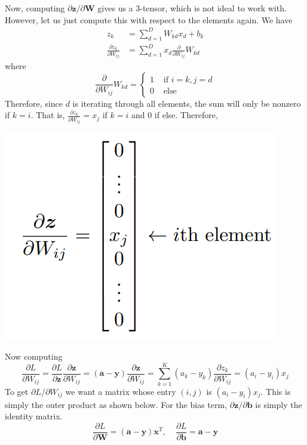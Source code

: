 \documentclass{article}
\theoremstyle{definition}
\begin{document}
  Now, computing $\partial \mathbf{z} / \partial \mathbf{W}$ gives us a $3$-tensor, which is not ideal to work with. However, let us just compute this with respect to the elements again. We have 
  \begin{align*}
      z_k & = \sum_{d=1}^D W_{kd} x_d + b_k \\ 
      \frac{\partial z_k}{\partial W_{ij}} & = \sum_{d=1}^D x_d \frac{\partial}{\partial W_{ij}} W_{kd}
  \end{align*}
  where 
  \[\frac{\partial}{\partial W_{ij}} W_{kd} = \begin{cases} 1 & \text{ if } i = k, j = d \\ 0 & \text{ else} \end{cases}\]
  Therefore, since $d$ is iterating through all elements, the sum will only be nonzero if $k = i$. That is, $\frac{\partial z_k}{\partial W_{ij}} = x_j$ if $k = i$ and $0$ if else. Therefore, 
  \begin{center}
      \includegraphics[scale=0.3]{softmax_deriv.png}
  \end{center}
  Now computing 
  \[\frac{\partial L}{\partial W_{ij}} = \frac{\partial L}{\partial \mathbf{z}} \frac{\partial \mathbf{z}}{\partial W_{ij}} = (\mathbf{a} - \mathbf{y}) \frac{\partial \mathbf{z}}{\partial W_{ij}} = \sum_{k=1}^K (a_k - y_k) \frac{\partial z_k}{\partial W_{ij}} = (a_i - y_i) x_j\]
  To get $\partial L / \partial W_{ij}$ we want a matrix whose entry $(i, j)$ is $(a_i - y_i) x_j$. This is simply the outer product as shown below. For the bias term, $\partial \mathbf{z} / \partial \mathbf{b}$ is simply the identity matrix. 
  \[\frac{\partial L}{\partial \mathbf{W}} = (\mathbf{a} - \mathbf{y}) \mathbf{x}^T, \;\;\;\; \frac{\partial L}{\partial \mathbf{b}} = \mathbf{a} - \mathbf{y}\]
\end{document}
